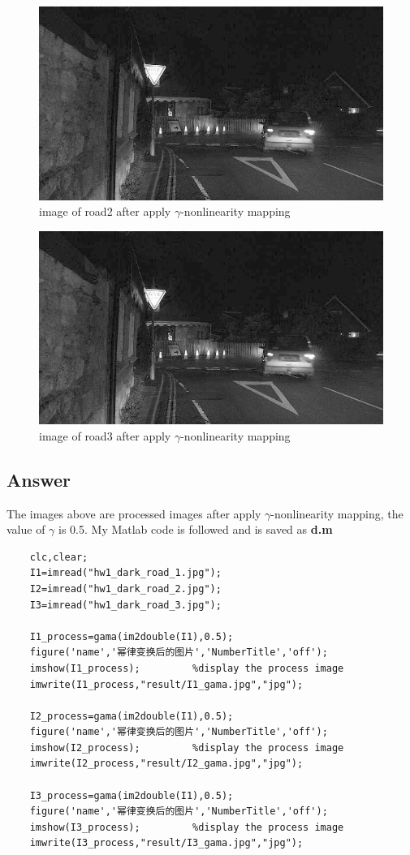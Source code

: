 \documentclass[
	12pt, %
]{fphw}
\begin{document}
\begin{figure}[H]
 
	\centering
	\includegraphics[width=1\columnwidth]{T2/result/I2_gama.jpg} 
	\caption{image of road2 after apply $\gamma$-nonlinearity mapping}
	\label{fig23}
\end{figure}
\begin{figure}[H]
 
	\centering
	\includegraphics[width=1\columnwidth]{T2/result/I3_gama.jpg} 
	\caption{image of road3 after apply $\gamma$-nonlinearity mapping}
	\label{fig24}
\end{figure}
\subsection*{Answer}
The images above are processed images after apply $\gamma$-nonlinearity mapping, the value of $\gamma$ is 0.5. My Matlab code is followed and is saved as \textbf{d.m}
\begin{lstlisting}
	clc,clear;
	I1=imread("hw1_dark_road_1.jpg");
	I2=imread("hw1_dark_road_2.jpg");
	I3=imread("hw1_dark_road_3.jpg");

	I1_process=gama(im2double(I1),0.5);
	figure('name','幂律变换后的图片','NumberTitle','off');
	imshow(I1_process);         %display the process image
	imwrite(I1_process,"result/I1_gama.jpg","jpg");

	I2_process=gama(im2double(I1),0.5);
	figure('name','幂律变换后的图片','NumberTitle','off');
	imshow(I2_process);         %display the process image
	imwrite(I2_process,"result/I2_gama.jpg","jpg");

	I3_process=gama(im2double(I1),0.5);
	figure('name','幂律变换后的图片','NumberTitle','off');
	imshow(I3_process);         %display the process image
	imwrite(I3_process,"result/I3_gama.jpg","jpg");
\end{lstlisting}
\end{document}

